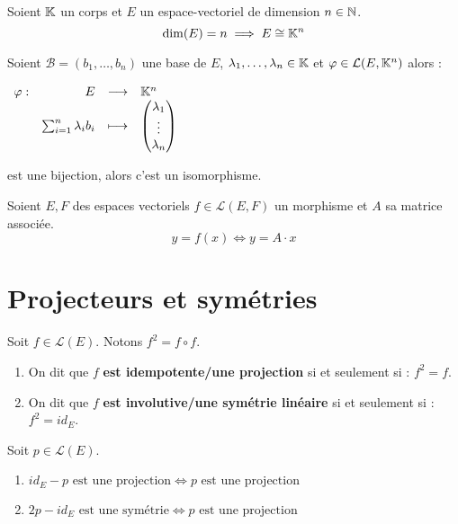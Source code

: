 \begin{lemma} Soient $\mathbb{K}$ un corps et $E$ un espace-vectoriel de dimension $n \in \mathbb{N}$.
    \[ \dim(E) = n \implies E \cong \mathbb{K}^n \]
\end{lemma}

\begin{lemma}
    Soient $\mathcal{B} = (b_1, \ldots, b_n)$ une base de $E$, $\lambda_1, \ldots, \lambda_n \in \mathbb{K}$ et $\varphi \in \mathcal{L}(E, \mathbb{K}^n)$  alors :
    \begin{center}
    	$
    	\begin{array}{rrcl} \varphi : & E & \longrightarrow & \mathbb{K}^n \\ & \sum_{i = 1}^{n} \lambda_i b_i & \longmapsto & 
    	\begin{pmatrix}
    		\lambda_1 \\
    		\vdots \\
    		\lambda_n
    	\end{pmatrix}
    	 \end{array}
    	$
    \end{center}
    est une bijection, alors c'est un isomorphisme.
\end{lemma}

\begin{proposition}
    Soient $E, F$ des espaces vectoriels $f \in \mathcal{L}(E, F)$ un morphisme et $A$ sa matrice associée. 
    \[ y = f(x) \iff y = A \cdot x \]
\end{proposition}

\section{Projecteurs et symétries}
\begin{definition}
    Soit $f \in \mathcal{L}(E)$. Notons $f^2 = f \circ f$.
    \begin{enumerate}
        \item On dit que $f$ \textbf{est idempotente/une projection} si et seulement si : $f^2 = f$.
        \item On dit que $f$ \textbf{est involutive/une symétrie linéaire} si et seulement si : $f^2 = id_E$.
    \end{enumerate}
\end{definition}

\begin{proposition} 
    Soit $p \in \mathcal{L}(E)$.
    \begin{enumerate}
        \item $id_E - p \text{ est une projection} \iff p \text{ est une projection}$
        \item $2p - id_E \text{ est une symétrie} \iff p \text{ est une projection}$
    \end{enumerate}
\end{proposition}

